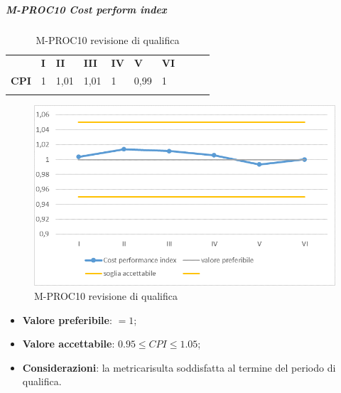 \subparagraph{M-PROC10 Cost perform index} \mbox{}
\begin{longtable}[H!] {						
		>{}p{50mm}  		
		>{}p{8mm}
		>{}p{8mm}		
		>{}p{8mm}		
		>{}p{8mm}		
		>{}p{8mm}		
		>{}p{8mm}
		>{}p{8mm}
		>{}p{8mm}
		>{}p{8mm}
	}
	\rowcolor{gray!50}
	\textbf{} & \textbf{I} & \textbf{II} & \textbf{III} & \textbf{IV} & \textbf{V} & \textbf{VI} \TBstrut \\ [2mm]
	\textbf{CPI} & 1 & 1,01 & 1,01 & 1 & 0,99 & 1 \TBstrut \\ [2mm]
	\rowcolor{white}
	\caption{M-PROC10 revisione di qualifica}
\end{longtable}
\begin{figure}[H] 	
	\includegraphics[width=\linewidth]{./img/grafici/RQ10.png}	
	\caption{M-PROC10 revisione di qualifica}	
\end{figure}
\begin{itemize}
	\item \textbf{Valore preferibile}: $=1$;
	\item \textbf{Valore accettabile}: $0.95 \le CPI \le 1.05$;
	\item \textbf{Considerazioni}: la metrica\glosp risulta soddisfatta al termine del periodo di qualifica.
\end{itemize}


